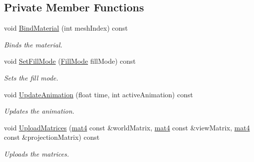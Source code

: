 \subsection*{Private Member Functions}
\begin{DoxyCompactItemize}
\item 
void \hyperlink{class_renderable_object_ac13b7599ac581dcb0ad6f7bf90b0aa2c}{Bind\+Material} (int mesh\+Index) const 
\begin{DoxyCompactList}\small\item\em Binds the material. \end{DoxyCompactList}\item 
void \hyperlink{class_renderable_object_a7c534dbc52e432bda389fd97891a68db}{Set\+Fill\+Mode} (\hyperlink{_i_renderable_object_8h_a75a9acd74effffae38daed55136b0980}{Fill\+Mode} fill\+Mode) const 
\begin{DoxyCompactList}\small\item\em Sets the fill mode. \end{DoxyCompactList}\item 
void \hyperlink{class_renderable_object_a843661db2d38d1a74ff974539dc3d257}{Update\+Animation} (float time, int active\+Animation) const 
\begin{DoxyCompactList}\small\item\em Updates the animation. \end{DoxyCompactList}\item 
void \hyperlink{class_renderable_object_ac504cf0d249e194eda261b45f629a7b8}{Upload\+Matrices} (\hyperlink{_types_8h_a2db59f395fe82a7394c6324956c265d8}{mat4} const \&world\+Matrix, \hyperlink{_types_8h_a2db59f395fe82a7394c6324956c265d8}{mat4} const \&view\+Matrix, \hyperlink{_types_8h_a2db59f395fe82a7394c6324956c265d8}{mat4} const \&projection\+Matrix) const 
\begin{DoxyCompactList}\small\item\em Uploads the matrices. \end{DoxyCompactList}\end{DoxyCompactItemize}
